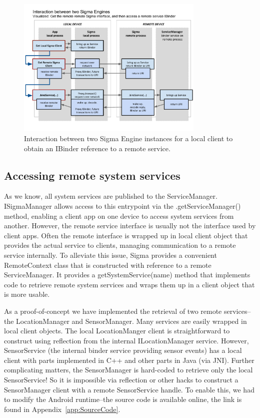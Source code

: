 \documentclass[prodmode]{acmlarge}
\begin{document}
\begin{figure}[h]
\centering
\includegraphics[width=0.8\textwidth]{drawings/SigmaEngineInteraction.pdf}
\caption{Interaction between two Sigma Engine instances for a local client to obtain an IBinder reference to a remote service.}
\label{fig:SigmaInteraction}
\end{figure}

\subsection{Accessing remote system services}
As we know, all system services are published to the ServiceManager. ISigmaManager allows access to this entrypoint via the .getServiceManager() method, enabling a client app on one device to access system services from another. However, the remote service interface is usually not the interface used by client apps. Often the remote interface is wrapped up in local client object that provides the actual service to clients, managing communication to a remote service internally. To alleviate this issue, Sigma provides a convenient RemoteContext class that is constructed with reference to a remote ServiceManager. It provides a getSystemService(name) method that implements code to retrieve remote system services and wraps them up in a client object that is more usable.

As a proof-of-concept we have implemented the retrieval of two remote services--the LocationManager and SensorManager. Many services are easily wrapped in local client objects. The local LocationManger client is straightforward to construct using reflection from the internal ILocationManager service. However, SensorService (the internal binder service providing sensor events) has a local client with parts implemented in C++ and other parts in Java (via JNI). Further complicating matters, the SensorManager is hard-coded to retrieve only the local SensorService! So it is impossible via reflection or other hacks to construct a SensorManager client with a remote SensorService handle. To enable this, we had to modify the Android runtime--the source code is available online, the link is found in Appendix~\ref{app:SourceCode}.
\end{document}
